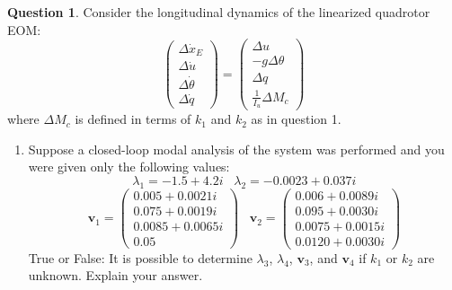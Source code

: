 \documentclass{article}
\theoremstyle{definition}
\newtheorem{question}{Question}
\begin{document}
\clearpage

\begin{question}
    Consider the longitudinal dynamics of the linearized quadrotor EOM:
    \begin{equation*}
        \left(\begin{array}{c}
        \Delta \dot{x}_E \\
        \Delta \dot{u} \\
        \Delta \dot{\theta} \\
        \Delta \dot{q}
        \end{array}\right)=\left(\begin{array}{c}
        \Delta u \\
        -g \Delta \theta \\
        \Delta q \\
        \frac{1}{I_u} \Delta M_c
        \end{array}\right)
    \end{equation*}
    where $\Delta M_c$ is defined in terms of $k_1$ and $k_2$ as in question 1. 

    \begin{enumerate}
        \item Suppose a closed-loop modal analysis of the system was performed and you were given only the following values:
    \begin{equation*}
        \lambda_1 = -1.5+4.2i \hspace{10pt} \lambda_2 = -0.0023+0.037i
    \end{equation*}
    \begin{equation*}
        \mathbf{v}_1 =  \left(\begin{array}{c}
        0.005+0.0021i \\
        0.075+0.0019i \\
        0.0085+0.0065i \\
        0.05 %
        \end{array}\right) 
        \hspace{10pt} \mathbf{v}_2 = \left(\begin{array}{c}
        0.006+0.0089i \\
        0.095+0.0030i \\
        0.0075+0.0015i \\
        0.0120+0.0030i %
        \end{array}\right) 
    \end{equation*}
    True or False: It is possible to determine $\lambda_3$, $\lambda_4$, $\mathbf{v}_3$, and $\mathbf{v}_4$ if $k_1$ or $k_2$ are unknown. Explain your answer.
    

\end{enumerate}
\end{question}
\end{document}
